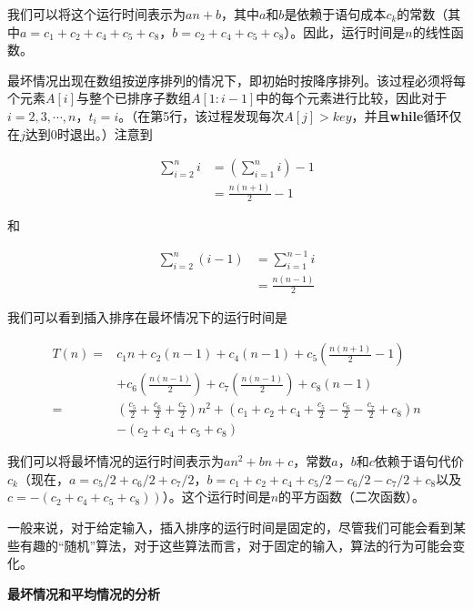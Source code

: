 \documentclass[lang=cn,newtx,10pt,scheme=chinese]{elegantbook}
\begin{document}
我们可以将这个运行时间表示为$an+b$，其中$a$和$b$是依赖于语句成本$c_k$的常数（其中$a = c_1 + c_2 + c_4 + c_5 + c_8$，$b = c_2 + c_4 + c_5 + c_8$）。因此，运行时间是$n$的线性函数。

最坏情况出现在数组按逆序排列的情况下，即初始时按降序排列。该过程必须将每个元素$A[i]$与整个已排序子数组$A[1:i-1]$中的每个元素进行比较，因此对于$i=2,3,\cdots,n$，$t_i = i$。（在第5行，该过程发现每次$A[j] > key$，并且\textbf{while}循环仅在$j$达到0时退出。）注意到

\begin{equation*}
\begin{aligned}
\sum_{i=2}^n i & =\left(\sum_{i=1}^n i\right)-1 \\
& =\frac{n(n+1)}{2}-1
\end{aligned}
\end{equation*}

和

\begin{equation*}
\begin{aligned}
\sum_{i=2}^n(i-1) & =\sum_{i=1}^{n-1} i \\
& =\frac{n(n-1)}{2}
\end{aligned}
\end{equation*}

我们可以看到插入排序在最坏情况下的运行时间是

\begin{equation}
\begin{aligned}
T(n)= & c_1 n+c_2(n-1)+c_4(n-1)+c_5\left(\frac{n(n+1)}{2}-1\right) \\
& +c_6\left(\frac{n(n-1)}{2}\right)+c_7\left(\frac{n(n-1)}{2}\right)+c_8(n-1) \\
= & \left(\frac{c_5}{2}+\frac{c_6}{2}+\frac{c_7}{2}\right) n^2+\left(c_1+c_2+c_4+\frac{c_5}{2}-\frac{c_6}{2}-\frac{c_7}{2}+c_8\right) n \\
& -\left(c_2+c_4+c_5+c_8\right)
\end{aligned}
\end{equation}

我们可以将最坏情况的运行时间表示为$an^2+bn+c$，常数$a$，$b$和$c$依赖于语句代价$c_k$（现在，$a=c_5 / 2+c_6 / 2+c_7 / 2$，$b=c_1+c_2+c_4+c_5 / 2-c_6 / 2-c_7 / 2+c_8$以及$\left.c=-\left(c_2+c_4+c_5+c_8\right)\right)$）。这个运行时间是$n$的平方函数（二次函数）。

一般来说，对于给定输入，插入排序的运行时间是固定的，尽管我们可能会看到某些有趣的``随机''算法，对于这些算法而言，对于固定的输入，算法的行为可能会变化。

\textbf{最坏情况和平均情况的分析}
\end{document}
